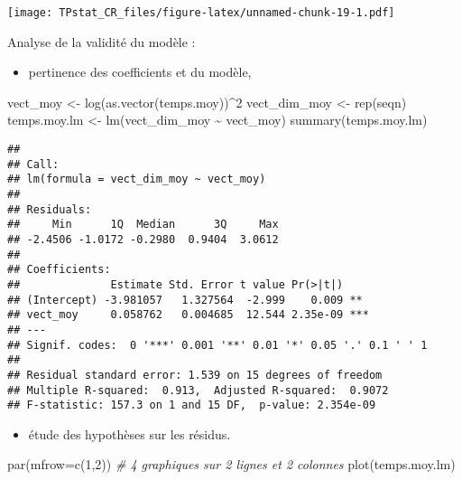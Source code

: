 \documentclass[
]{article}
\newenvironment{Shaded}{\begin{snugshade}}{\end{snugshade}}
\newcommand{\AttributeTok}[1]{\textcolor[rgb]{0.77,0.63,0.00}{#1}}
\newcommand{\CommentTok}[1]{\textcolor[rgb]{0.56,0.35,0.01}{\textit{#1}}}
\newcommand{\DecValTok}[1]{\textcolor[rgb]{0.00,0.00,0.81}{#1}}
\newcommand{\FunctionTok}[1]{\textcolor[rgb]{0.00,0.00,0.00}{#1}}
\newcommand{\NormalTok}[1]{#1}
\newcommand{\OtherTok}[1]{\textcolor[rgb]{0.56,0.35,0.01}{#1}}
\newcommand{\SpecialCharTok}[1]{\textcolor[rgb]{0.00,0.00,0.00}{#1}}
\providecommand{\tightlist}{%
  \setlength{\itemsep}{0pt}\setlength{\parskip}{0pt}}
\begin{document}
\texttt{[image: TPstat\_CR\_files/figure-latex/unnamed-chunk-19-1.pdf]}

Analyse de la validité du modèle :

\begin{itemize}
\tightlist
\item
  pertinence des coefficients et du modèle,
\end{itemize}

\begin{Shaded}
\begin{Highlighting}[]
\NormalTok{vect\_moy }\OtherTok{\textless{}{-}} \FunctionTok{log}\NormalTok{(}\FunctionTok{as.vector}\NormalTok{(temps.moy))}\SpecialCharTok{\^{}}\DecValTok{2}
\NormalTok{vect\_dim\_moy }\OtherTok{\textless{}{-}} \FunctionTok{rep}\NormalTok{(seqn)}
\NormalTok{temps.moy.lm }\OtherTok{\textless{}{-}} \FunctionTok{lm}\NormalTok{(vect\_dim\_moy }\SpecialCharTok{\textasciitilde{}}\NormalTok{ vect\_moy)}
\FunctionTok{summary}\NormalTok{(temps.moy.lm)}
\end{Highlighting}
\end{Shaded}

\begin{verbatim}
## 
## Call:
## lm(formula = vect_dim_moy ~ vect_moy)
## 
## Residuals:
##     Min      1Q  Median      3Q     Max 
## -2.4506 -1.0172 -0.2980  0.9404  3.0612 
## 
## Coefficients:
##              Estimate Std. Error t value Pr(>|t|)    
## (Intercept) -3.981057   1.327564  -2.999    0.009 ** 
## vect_moy     0.058762   0.004685  12.544 2.35e-09 ***
## ---
## Signif. codes:  0 '***' 0.001 '**' 0.01 '*' 0.05 '.' 0.1 ' ' 1
## 
## Residual standard error: 1.539 on 15 degrees of freedom
## Multiple R-squared:  0.913,  Adjusted R-squared:  0.9072 
## F-statistic: 157.3 on 1 and 15 DF,  p-value: 2.354e-09
\end{verbatim}

\begin{itemize}
\tightlist
\item
  étude des hypothèses sur les résidus.
\end{itemize}

\begin{Shaded}
\begin{Highlighting}[]
\FunctionTok{par}\NormalTok{(}\AttributeTok{mfrow=}\FunctionTok{c}\NormalTok{(}\DecValTok{1}\NormalTok{,}\DecValTok{2}\NormalTok{)) }\CommentTok{\# 4 graphiques sur 2 lignes et 2 colonnes}
\FunctionTok{plot}\NormalTok{(temps.moy.lm)}
\end{Highlighting}
\end{Shaded}
\end{document}
